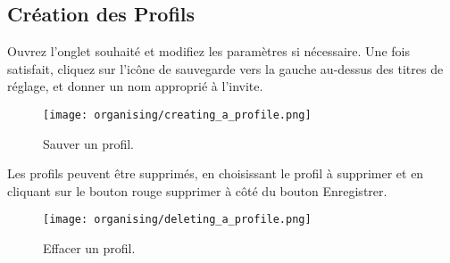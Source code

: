 \subsection{Cr\'eation des Profils} %
\label{sub:creating_profiles}

Ouvrez l'onglet souhait\'e et modifiez les param\`etres si n\'ecessaire. Une fois satisfait, cliquez sur l'ic\^one de sauvegarde vers la gauche au-dessus des titres de r\'eglage, et donner un nom appropri\'e \`a l'invite.

\begin{figure}[H]
\centering
\texttt{[image: organising/creating\_a\_profile.png]}
\caption{Sauver un profil.}
\label{fig:creating_a_profile}
\end{figure}

Les profils peuvent \^etre supprim\'es, en choisissant le profil \`a supprimer et en cliquant sur le bouton rouge supprimer \`a c\^ot\'e du bouton Enregistrer.

\begin{figure}[H]
\centering
\texttt{[image: organising/deleting\_a\_profile.png]}
\caption{Effacer un profil.}
\label{fig:deleting_a_profile}
\end{figure}



